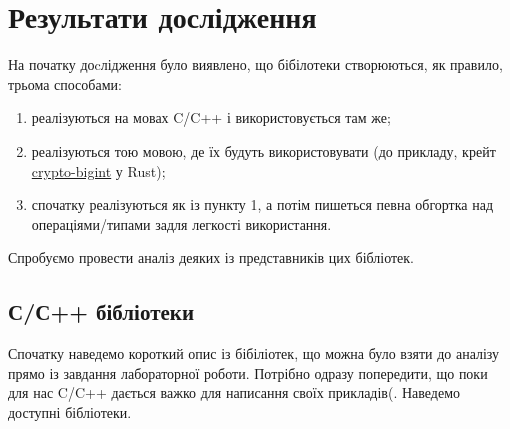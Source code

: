 
\chapter{Результати дослідження}
\label{chap:research_results} 

На початку доcлідження було виявлено, що бібілотеки створюються, як правило, трьома способами:
\begin{enumerate}
	\item реалізуються на мовах C/C++ і використовується там же;
	\item реалізуються тою мовою, де їх будуть використовувати (до прикладу, крейт \href{https://docs.rs/crypto-bigint/latest/crypto_bigint/}{crypto-bigint} у Rust);
	\item спочатку реалізуються як із пункту 1, а потім пишеться певна обгортка над операціями/типами задля легкості використання.
\end{enumerate}

Спробуємо провести аналіз деяких із представників цих бібліотек.


\section{С/С++ бібліотеки}
Спочатку наведемо короткий опис із бібіліотек, що можна було взяти до аналізу прямо із завдання лабораторної роботи. Потрібно одразу попередити, що поки для нас C/C++ дається важко для написання своїх прикладів(. Наведемо доступні бібліотеки.

